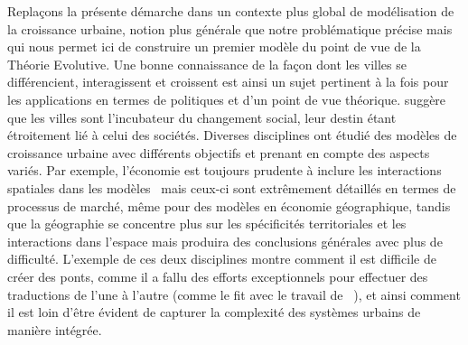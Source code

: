 {Replaçons la présente démarche dans un contexte plus global de modélisation de la croissance urbaine, notion plus générale que notre problématique précise mais qui nous permet ici de construire un premier modèle du point de vue de la Théorie Evolutive. Une bonne connaissance de la façon dont les villes se différencient, interagissent et croissent est ainsi un sujet pertinent à la fois pour les applications en termes de politiques et d'un point de vue théorique. \cite{pumain2009innovation} suggère que les villes sont l'incubateur du changement social, leur destin étant étroitement lié à celui des sociétés. Diverses disciplines ont étudié des modèles de croissance urbaine avec différents objectifs et prenant en compte des aspects variés. Par exemple, l'économie est toujours prudente à inclure les interactions spatiales dans les modèles~\cite{krugman1998space} mais ceux-ci sont extrêmement détaillés en termes de processus de marché, même pour des modèles en économie géographique, tandis que la géographie se concentre plus sur les spécificités territoriales et les interactions dans l'espace mais produira des conclusions générales avec plus de difficulté. L'exemple de ces deux disciplines montre comment il est difficile de créer des ponts, comme il a fallu des efforts exceptionnels pour effectuer des traductions de l'une à l'autre (comme  le fit avec le travail de ~\cite{taylor2016polymath}), et ainsi comment il est loin d'être évident de capturer la complexité des systèmes urbains de manière intégrée.
}



